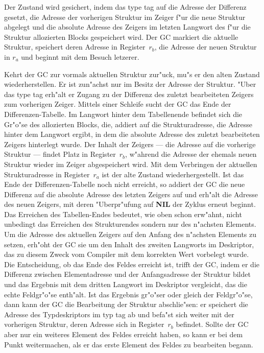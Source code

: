 Der Zustand wird gesichert, indem das type tag auf die Adresse der Differenz
gesetzt, die Adresse der vorherigen Struktur im Zeiger f"ur die neue
Struktur abgelegt und die absolute Adresse des Zeigers im letzten
Langwort des f"ur die Struktur allozierten Blocks gespeichert wird.
Der GC markiert die aktuelle Struktur, speichert deren Adresse in
Register~$r_b$, die Adresse der neuen Struktur in $r_a$ und beginnt mit
dem Besuch letzerer.

\medskip
Kehrt der GC zur vormals aktuellen Struktur zur"uck, mu"s er den alten
Zustand wiederherstellen.
Er ist zun"achst nur im Besitz der Adresse der Struktur.
"Uber das type tag erh"alt er Zugang zu der Differenz des zuletzt
bearbeiteten Zeigers zum vorherigen Zeiger.
Mittels einer Schleife sucht der GC das Ende der Differenzen-Tabelle.
Im Langwort hinter dem Tabellenende befindet sich die Gr"o"se des
allozierten Blocks, die, addiert auf die Strukturadresse, die Adresse
hinter dem Langwort ergibt, in dem die absolute Adresse des
zuletzt bearbeiteten Zeigers hinterlegt wurde.
Der Inhalt der Zeigers --- die Adresse auf die vorherige Struktur --- findet Platz
in Register~$r_b$, w"ahrend die Adresse der ehemals neuen Struktur wieder
im Zeiger abgespeichert wird.
Mit dem Verbringen der aktuellen Strukturadresse in Register~$r_a$ ist der
alte Zustand wiederhergestellt.
Ist das Ende der Differenzen-Tabelle noch nicht erreicht, so addiert der GC
die neue Differenz auf die absolute Adresse des letzten Zeigers auf und erh"alt
die Adresse des neuen Zeigers, mit deren "Uberpr"ufung auf {\bf NIL} der
Zyklus erneut beginnt.
Das Erreichen des Tabellen-Endes bedeutet, wie oben schon erw"ahnt, nicht
unbedingt das Erreichen des Strukturendes sondern nur des n"achsten Elements.
Um die Adresse des aktuellen Zeigers auf den Anfang des n"achsten Elements
zu setzen, erh"oht der GC sie um den Inhalt des zweiten Langworts im Deskriptor,
das zu diesem Zweck vom Compiler mit dem korrekten Wert vorbelegt wurde.
Die Entscheidung, ob das Ende des Feldes erreicht ist, trifft der GC, indem
er die Differenz zwischen Elementadresse und der Anfangsadresse der Struktur
bildet und das Ergebnis mit dem dritten Langwort im Deskriptor vergleicht, das
die echte Feldgr"o"se enth"alt.
Ist das Ergebnis gr"o"ser oder gleich der Feldgr"o"se, dann kann der GC die
Bearbeitung der Struktur abschlie"sen:
er speichert die Adresse des Typdeskriptors im typ tag ab und befa"st sich
weiter mit der vorherigen Struktur, deren Adresse sich in Register~$r_b$
befindet.
Sollte der GC aber nur ein weiteres Element des Feldes erreicht haben, so
kann er bei dem Punkt weitermachen, als er das erste Element des Feldes
zu bearbeiten begann.

